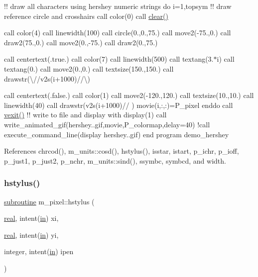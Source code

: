 !! draw all characters using hershey numeric strings do i=1,topsym !! draw reference circle and crosshairs call color(0) call \hyperlink{namespacem__pixel_af3b81a21a0b2f6b5eddd09c031bd6173}{clear()}

call color(4) call linewidth(100) call circle(0.,0.,75.) call move2(-\/75.,0.) call draw2(75.,0.) call move2(0.,-\/75.) call draw2(0.,75.)

call centertext(.true.) call color(7) call linewidth(500) call textang(3.$\ast$i) call textang(0.) call move2(0.,0.) call textsize(150.,150.) call drawstr(\textquotesingle{}\textbackslash{}\textquotesingle{}//v2s(i+1000)//\textquotesingle{}\textbackslash{}\textquotesingle{})

call centertext(.false.) call color(1) call move2(-\/120.,120.) call textsize(10.,10.) call linewidth(40) call drawstr(v2s(i+1000)//\textquotesingle{} \textquotesingle{}) movie(i,\+:,\+:)=P\+\_\+pixel enddo call \hyperlink{namespacem__pixel_a19ad6b65752322b0029a62cc0ebec3e8}{vexit()} !! write to file and display with display(1) call write\+\_\+animated\+\_\+gif(\textquotesingle{}hershey..\+gif\textquotesingle{},movie,P\+\_\+colormap,delay=40) !call execute\+\_\+command\+\_\+line(\textquotesingle{}display hershey..\+gif\textquotesingle{}) end program demo\+\_\+hershey 

References chrcod(), m\+\_\+units\+::cosd(), hstylus(), isstar, istart, p\+\_\+ichr, p\+\_\+ioff, p\+\_\+just1, p\+\_\+just2, p\+\_\+nchr, m\+\_\+units\+::sind(), ssymbc, symbcd, and width.

\mbox{\label{namespacem__pixel_a15c5daa9ab477991c2c6e17741cf40eb}} 
\subsubsection{\texorpdfstring{hstylus()}{hstylus()}}
{\footnotesize\ttfamily \hyperlink{M__stopwatch_83_8txt_acfbcff50169d691ff02d4a123ed70482}{subroutine} m\+\_\+pixel\+::hstylus (\begin{DoxyParamCaption}\item[{\hyperlink{read__watch_83_8txt_abdb62bde002f38ef75f810d3a905a823}{real}, intent(\hyperlink{M__journal_83_8txt_afce72651d1eed785a2132bee863b2f38}{in})}]{xi,  }\item[{\hyperlink{read__watch_83_8txt_abdb62bde002f38ef75f810d3a905a823}{real}, intent(\hyperlink{M__journal_83_8txt_afce72651d1eed785a2132bee863b2f38}{in})}]{yi,  }\item[{integer, intent(\hyperlink{M__journal_83_8txt_afce72651d1eed785a2132bee863b2f38}{in})}]{ipen }\end{DoxyParamCaption})\hspace{0.3cm}{\ttfamily [private]}}



